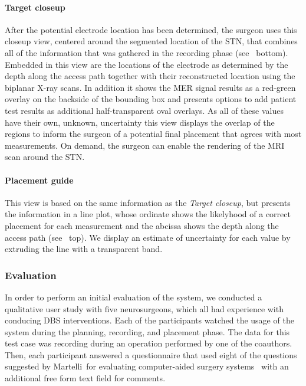 \paragraph{Target closeup} After the potential electrode location has been determined, the surgeon uses this closeup view, centered around the segmented location of the STN, that combines all of the information that was gathered in the recording phase (see~ bottom). Embedded in this view are the locations of the electrode as determined by the depth along the access path together with their reconstructed location using the biplanar X-ray scans. In addition it shows the MER signal results as a red-green overlay on the backside of the bounding box and presents options to add patient test results as additional half-transparent oval overlays. As all of these values have their own, unknown, uncertainty this view displays the overlap of the regions to inform the surgeon of a potential final placement that agrees with most measurements. On demand, the surgeon can enable the rendering of the MRI scan around the STN.

\paragraph{Placement guide} This view is based on the same information as the \emph{Target closeup}, but presents the information in a line plot, whose ordinate shows the likelyhood of a correct placement for each measurement and the abcissa shows the depth along the access path (see~ top). We display an estimate of uncertainty for each value by extruding the line with a transparent band.

\subsubsection{Evaluation}
\label{contributions:medbio:dbs:evaluation}
In order to perform an initial evaluation of the system, we conducted a qualitative user study with five neurosurgeons, which all had experience with conducing DBS interventions. Each of the participants watched the usage of the system during the planning, recording, and placement phase. The data for this test case was recording during an operation performed by one of the coauthors. Then, each participant answered a questionnaire that used eight of the questions suggested by Martelli~\etal for evaluating computer-aided surgery systems~\cite{martelli2003criteria} with an additional free form text field for comments.

